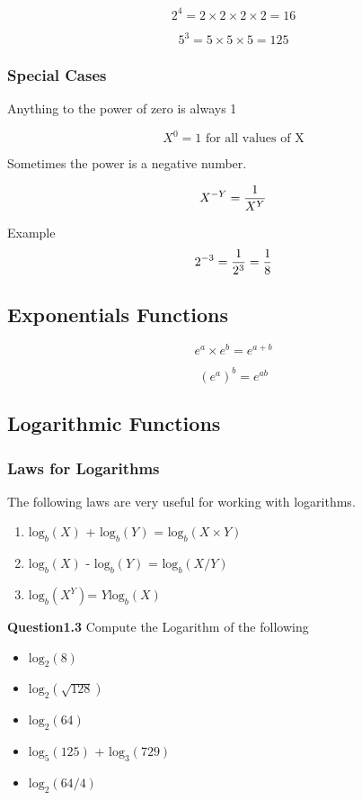 \documentclass[12pt]{article}
\begin{document}
\[  2^ 4 = 2 \times 2 \times 2 \times 2 = 16 \]

\[  5^ 3 = 5 \times 5 \times 5 =125 \]

\subsubsection{Special Cases}

Anything to the power of zero is always 1

\[  X^ 0 = 1 \mbox{ for all values of X} \]

Sometimes the power is a negative number.

\[  X^{-Y} = { 1 \over X^Y}  \]

Example 
\[  2^{-3} = { 1 \over 2^3} = { 1 \over 8}  \]



\subsection{Exponentials Functions}

\[ e^a \times e^b = e^{a+b}\]

\[ (e^a )^b = e^{ab}\]
\subsection{Logarithmic Functions}

\subsubsection{Laws for Logarithms}
The following laws are very useful for working with logarithms.
\begin{enumerate}
\item $\mbox{log}_b(X)$ + $\mbox{log}_b(Y)$ = $\mbox{log}_b(X\times Y)$
\item $\mbox{log}_b(X)$ - $\mbox{log}_b(Y)$ = $\mbox{log}_b(X / Y)$
\item $\mbox{log}_b(X^Y)$= $Y \mbox{log}_b(X)$
\end{enumerate}

\noindent \textbf{Question1.3} Compute the Logarithm of the following
\begin{itemize}
\item $\mbox{log}_2(8)$
\item $\mbox{log}_2(\sqrt{128})$
\item $\mbox{log}_2(64)$
\item $\mbox{log}_5(125)$ +   $\mbox{log}_3(729)$
\item $\mbox{log}_2(64/4)$
\end{itemize}
\end{document}
